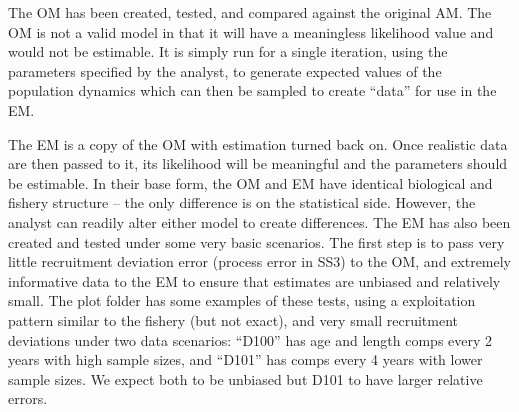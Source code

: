 \documentclass{article}
\begin{document}
The OM has been created, tested, and compared against the original AM. The
OM is not a valid model in that it will have a meaningless likelihood value
and would not be estimable. It is simply run for a single iteration, using
the parameters specified by the analyst, to generate expected values of the
population dynamics which can then be sampled to create ``data'' for use
in the EM.

The EM is a copy of the OM with estimation turned back on. Once realistic
data are then passed to it, its likelihood will be meaningful and the
parameters should be estimable. In their base form, the OM and EM have
identical biological and fishery structure -- the only difference is on the
statistical side. However, the analyst can readily alter either model to
create differences. The EM has also been created and tested under some very
basic scenarios. The first step is to pass very little recruitment
deviation error (process error in SS3) to the OM, and extremely informative
data to the EM to ensure that estimates are unbiased and relatively
small. The plot folder has some examples of these tests, using a
exploitation pattern similar to the fishery (but not exact), and very small
recruitment deviations under two data scenarios: ``D100'' has age and
length comps every 2 years with high sample sizes, and ``D101'' has comps
every 4 years with lower sample sizes. We expect both to be unbiased but
D101 to have larger relative errors.
\end{document}
